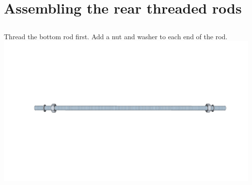 \documentclass[twoside,a4paper,titlepage]{memoir}
\begin{document}
	\chapter{Assembling the rear threaded rods}
	
	\section{}
	Thread the bottom rod first. Add a nut and washer to each end of the rod.\\
	\includegraphics[width=1\linewidth]{graphics/ch3_1.png}
	
\end{document}
